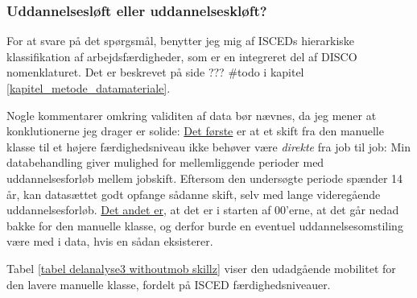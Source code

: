 %
\subsubsection{Uddannelsesløft eller uddannelseskløft?}
%


For at svare på det spørgsmål, benytter jeg mig af ISCEDs hierarkiske klassifikation af arbejdsfærdigheder, som er en integreret del af DISCO nomenklaturet. Det er beskrevet på side ??? \#todo i kapitel \ref{kapitel_metode_datamateriale}. 

Nogle kommentarer omkring validiten af data bør nævnes, da jeg mener at konklutionerne jeg drager er solide: \underline{Det første} er at et skift fra den manuelle klasse til et højere færdighedsniveau ikke behøver være \emph{direkte} fra job til job: Min databehandling giver mulighed for mellemliggende perioder med uddannelsesforløb mellem jobskift. Eftersom den undersøgte periode spænder 14 år, kan datasættet godt opfange sådanne skift, selv med lange videregående uddannelsesforløb. \underline{Det andet er}, at  det er i starten af 00'erne, at det går nedad bakke for den manuelle klasse, og derfor burde en eventuel uddannelsesomstiling være med i data, hvis en sådan eksisterer. %


Tabel \ref{tabel delanalyse3 withoutmob skillz} viser den udadgående mobilitet for den lavere manuelle klasse, fordelt på ISCED færdighedsniveauer. 




